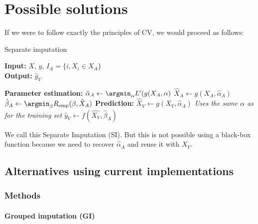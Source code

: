 	\section{Possible solutions}
	\label{ERM.solutions}
	
If we were to follow exactly the principles of CV, we would proceed as follows: 
\begin{algorithm}[H]
	\caption{Separate imputation}
	\hspace*{\algorithmicindent} \textbf{Input:} $X$, $y$, $I_A=\{i, X_i \in X_A\}$ \\
 	\hspace*{\algorithmicindent} \textbf{Output:} $\hat{y}_V$
	\begin{algorithmic}[1]
		\State \textbf{Parameter estimation:}
		\Indstate $\hat{\alpha}_A \leftarrow \argmin_{\alpha} L'(g(X_A,\alpha)$
		\Indstate $\hat{X}_A \leftarrow g(X_A, \hat{\alpha}_A)$
		\Indstate $\hat{\beta}_A \leftarrow \argmin_{\beta} R_{\text{emp}}(\beta,\hat{X}_A)$
		\State \textbf{Prediction:}
		\Indstate $\hat{X}_V \leftarrow g(X_V, \hat{\alpha}_A)$ \Comment \emph{Uses the same $\alpha$ as for the training set}
		\Indstate $\hat{y}_V \leftarrow f(\hat{X_V}, \hat{\beta}_A)$
	\end{algorithmic}
\end{algorithm}

We call this Separate Imputation (SI). But this is not possible using a black-box function because we need to recover $\hat{\alpha}_A$ and reuse it with $X_V$.

		\subsection{Alternatives using current implementations}
			\subsubsection{Methods}

\paragraph{Grouped imputation (GI)} 

